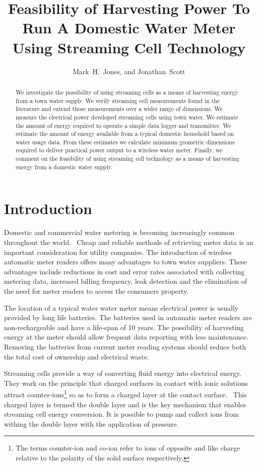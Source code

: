 \documentclass[10pt,final,journal]{IEEEtran}
\title{Feasibility of Harvesting Power To Run A Domestic Water Meter Using Streaming Cell Technology}
\author{Mark~H.~Jones, and Jonathan~Scott}
\begin{document}
    \maketitle

    \begin{abstract}
        We investigate the possibility of using streaming cells as a means of harvesting energy from a town water supply.
        We verify streaming cell measurements found in the literature and extend those measurements over a wider range of dimensions.
        We measure the electrical power developed streaming cells using town water.
        We estimate the amount of energy required to operate a simple data logger and transmitter.
        We estimate the amount of energy available from a typical domestic household based on water usage data.
        From these estimates we calculate minimum geometric dimensions required to deliver practical power output to a wireless water meter.
        Finally, we comment on the feasibility of using streaming cell technology as a means of harvesting energy from a domestic water supply.
    \end{abstract}

    \section{Introduction}
    Domestic and commercial water metering is becoming increasingly common throughout the world.~\cite{Chang2012}
    Cheap and reliable methods of retrieving meter data is an important consideration for utility companies.
    The introduction of wireless automatic meter readers offers many advantages to town water suppliers.
    These advantages include reductions in cost and error rates associated with collecting metering data, increased billing frequency, leak detection and the elimination of the need for meter readers to access the consumers property.~\cite{Chang2012,Britton2013}

    The location of a typical water water meter means electrical power is usually provided by long life batteries.
    The batteries used in automatic meter readers are non-rechargeable and have a life-span of 10 years.\cite{BMeters2014}
    The possibility of harvesting energy at the meter should allow frequent data reporting with less maintenance.
    Removing the batteries from current meter reading systems should reduce both the total cost of ownership and electrical waste.

    Streaming cells provide a way of converting fluid energy into electrical energy.
    They work on the principle that charged surfaces in contact with ionic solutions attract counter-ions\footnote{The terms counter-ion and co-ion refer to ions of opposite and like charge relative to the polarity of the solid surface respectively.} so as to form a charged layer at the contact surface.~\cite{Stein2004}
    This charged layer is termed the double layer and is the key mechanism that enables streaming cell energy conversion.
    It is possible to pump and collect ions from withing the double layer with the application of pressure.
\end{document}
